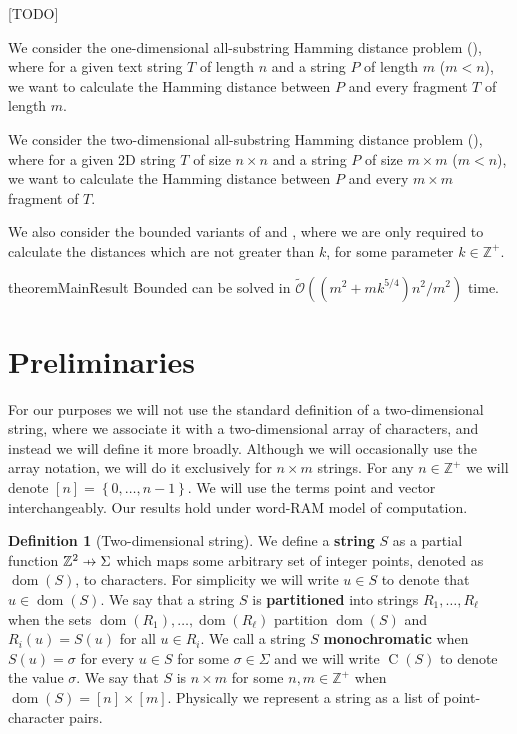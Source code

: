 \documentclass[11pt]{article}
\newcommand{\Z}{\mathbb{Z}}
\newcommand{\tO}{\tilde{\mathcal{O}}}
\newcommand{\set}[1]{\left\lbrace #1 \right\rbrace}
\theoremstyle{plain}
\theoremstyle{definition}
\newtheorem{definition}{Definition}
\theoremstyle{remark}
\DeclareMathOperator*{\dom}{dom}
\DeclareMathOperator*{\charrr}{C}
\begin{document}
[TODO]

We consider the one-dimensional all-substring Hamming distance problem (\hd), where for a given text string $T$ of length $n$ and a string $P$ of length $m$ ($m < n$), we want to calculate the Hamming distance between $P$ and every fragment $T$ of length $m$.

We consider the two-dimensional all-substring Hamming distance problem (\HD), where for a given 2D string $T$ of size $n \times n$ and a string $P$ of size $m \times m$ ($m < n$), we want to calculate the Hamming distance between $P$ and every $m \times m$ fragment of $T$.

We also consider the bounded variants of \hd and \HD, where we are only required to calculate the distances which are not greater than $k$, for some parameter $k \in \Z^+$.

\begin{restatable*}{theorem}{MainResult}\label{main result}
	Bounded \HD can be solved in $\tO((m^2 + mk^{5/4})n^2 / m^2)$ time.
\end{restatable*}


\section{Preliminaries}

For our purposes we will not use the standard definition of a two-dimensional string, where we associate it with a two-dimensional array of characters, and instead we will define it more broadly.
Although we will occasionally use the array notation, we will do it exclusively for $n \times m$ strings.
For any $n \in \Z^+$ we will denote $[n] = \set{0, \dots, n - 1}$.
We will use the terms point and vector interchangeably.
Our results hold under word-RAM model of computation.

\newcommand{\getchar}[1]{\charrr(#1)}
\newcommand{\pto}{\mathrel{\ooalign{\hfil$\mapstochar\mkern5mu$\hfil\cr$\to$\cr}}}
\renewcommand{\d}[1]{\dom(#1)}
\newcommand{\f}[1]{#1^\mathbf{f}}
\begin{definition}[Two-dimensional string]
	We define a \textbf{string} $S$ as a partial function $\Z^2 \pto \Sigma$ which maps some arbitrary set of integer points, denoted as $\d{S}$, to characters.
	For simplicity we will write $u \in S$ to denote that $u \in \d{S}$.
	We say that a string $S$ is \textbf{partitioned} into strings $R_1, \dots, R_\ell$ when the sets $\d{R_1}, \dots, \d{R_\ell}$ partition $\d{S}$ and $R_i(u) = S(u)$ for all $u \in R_i$.
	We call a string $S$ \textbf{monochromatic} when $S(u) = \sigma$ for every $u \in S$ for some $\sigma \in \Sigma$ and we will write $\getchar{S}$ to denote the value $\sigma$.
	We say that $S$ is $n \times m$ for some $n, m \in \Z^+$ when $\d{S} = [n] \times [m]$.
	Physically we represent a string as a list of point-character pairs.
\end{definition}
\end{document}

